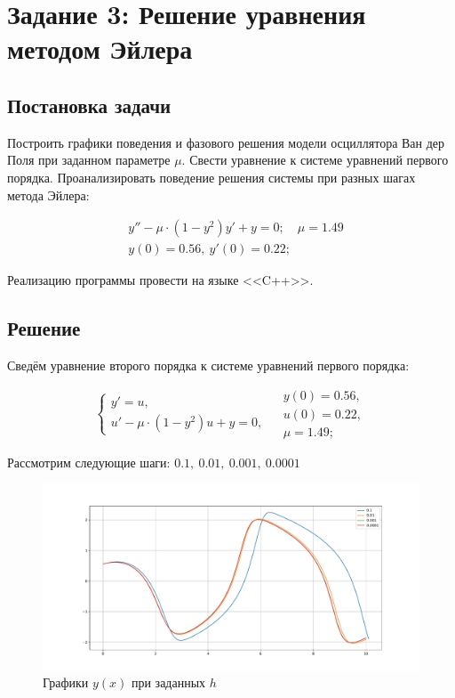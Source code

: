 \section{Задание 3: Решение уравнения методом Эйлера}
    \subsection{Постановка задачи}
        Построить графики поведения и фазового решения модели осциллятора Ван
        дер Поля при заданном параметре \(\mu\). Свести уравнение к системе уравнений
        первого порядка. Проанализировать поведение решения системы при разных
        шагах метода Эйлера:

        \begin{align*}
            &y'' - \mu \cdot (1 - y^2)y' + y = 0; \quad \mu = 1.49 \\
            &y(0) = 0.56, ~ y'(0) = 0.22;
        \end{align*}

        Реализацию программы провести на языке <<C++>>.

    \subsection{Решение}
        Сведём уравнение второго порядка к системе уравнений первого порядка:

        \[
            \begin{cases}
                y' = u, \\
                u' - \mu \cdot(1 - y^2)u + y = 0,
            \end{cases}
            \begin{split}
                &y(0) = 0.56, \\
                &u(0) = 0.22, \\
                &\mu = 1.49;
            \end{split}  
        \]

        Рассмотрим следующие шаги: \( 0.1, ~ 0.01, ~ 0.001, ~ 0.0001 \)

        \begin{figure}[H]
            \includegraphics[width=15cm]{pics/3_1.pdf}
            \centering
            \caption{Графики \(y(x)\) при заданных \(h\)}
        \end{figure}

